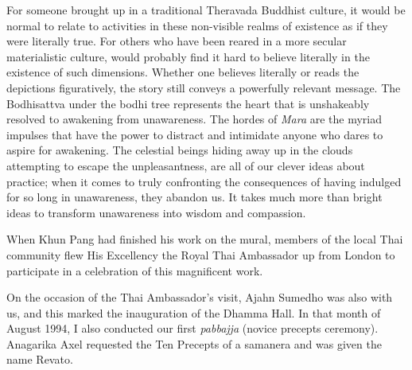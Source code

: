 For someone brought up in a traditional Theravada Buddhist culture, it
would be normal to relate to activities in these non-visible realms of
existence as if they were literally true. For others who have been reared
in a more secular materialistic culture, would probably find it hard to
believe literally in the existence of such dimensions. Whether one
believes literally or reads the depictions figuratively, the story still
conveys a powerfully relevant message. The Bodhisattva under the bodhi
tree represents the heart that is unshakeably resolved to awakening from
unawareness. The hordes of \emph{Mara} are the myriad impulses that have
the power to distract and intimidate anyone who dares to aspire for
awakening. The celestial beings hiding away up in the clouds attempting
to escape the unpleasantness, are all of our clever ideas about
practice; when it comes to truly confronting the consequences of having
indulged for so long in unawareness, they abandon us. It takes much more
than bright ideas to transform unawareness into wisdom and compassion.

When Khun Pang had finished his work on the mural, members of the local
Thai community flew His Excellency the Royal Thai Ambassador up from
London to participate in a celebration of this magnificent work.

On the occasion of the Thai Ambassador's visit, Ajahn Sumedho was also
with us, and this marked the inauguration of the Dhamma Hall. In that
month of August 1994, I also conducted our first \emph{pabbajja} (novice
precepts ceremony). Anagarika Axel requested the Ten Precepts of a
samanera and was given the name Revato.

